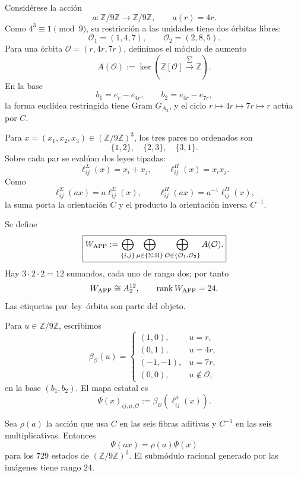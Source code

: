 Considérese la acción
\[
 a:\mathbb Z/9\mathbb Z\longrightarrow\mathbb Z/9\mathbb Z,
 \qquad a(r)=4r.
\]
Como \(4^3\equiv1\pmod9\), su restricción a las unidades tiene dos órbitas
libres:
\[
 \mathcal O_1=(1,4,7),
 \qquad
 \mathcal O_2=(2,8,5).
\]
Para una órbita \(\mathcal O=(r,4r,7r)\), definimos el módulo de aumento
\[
 A(\mathcal O):=
 \ker\!\left(\mathbb Z[\mathcal O]
 \xrightarrow{\,\sum\,}\mathbb Z\right).
\]
En la base
\[
 b_1=e_r-e_{4r},
 \qquad b_2=e_{4r}-e_{7r},
\]
la forma euclídea restringida tiene Gram \(G_{A_2}\), y el ciclo
\(r\mapsto4r\mapsto7r\mapsto r\) actúa por \(C\).

Para \(x=(x_1,x_2,x_3)\in(\mathbb Z/9\mathbb Z)^3\), los tres pares no
ordenados son
\[
 \{1,2\},\quad\{2,3\},\quad\{3,1\}.
\]
Sobre cada par se evalúan dos leyes tipadas:
\[
 \ell_{ij}^{\Sigma}(x)=x_i+x_j,
 \qquad
 \ell_{ij}^{\Pi}(x)=x_ix_j.
\]
Como
\[
 \ell_{ij}^{\Sigma}(ax)=a\ell_{ij}^{\Sigma}(x),
 \qquad
 \ell_{ij}^{\Pi}(ax)=a^{-1}\ell_{ij}^{\Pi}(x),
\]
la suma porta la orientación \(C\) y el producto la orientación inversa
\(C^{-1}\).

\begin{definition}
\label{p12-83-c1-s5:def:modulo-ciclotomico-app-autonomo}
Se define
\[
 \boxed{
 W_{\rm APP}:=
 \bigoplus_{\{i,j\}}
 \bigoplus_{\mu\in\{\Sigma,\Pi\}}
 \bigoplus_{\mathcal O\in\{\mathcal O_1,\mathcal O_2\}}
 A(\mathcal O).}
\]
Hay \(3\cdot2\cdot2=12\) sumandos, cada uno de rango dos; por tanto
\[
 W_{\rm APP}\cong A_2^{12},
 \qquad \operatorname{rank}W_{\rm APP}=24.
\]
Las etiquetas par--ley--órbita son parte del objeto.
\end{definition}

Para \(u\in\mathbb Z/9\mathbb Z\), escribimos
\[
 \beta_{\mathcal O}(u)=
 \begin{cases}
 (1,0),&u=r,\\
 (0,1),&u=4r,\\
 (-1,-1),&u=7r,\\
 (0,0),&u\notin\mathcal O,
 \end{cases}
\]
en la base \((b_1,b_2)\). El mapa estatal es
\[
 \Psi(x)_{ij,\mu,\mathcal O}
 :=\beta_{\mathcal O}(\ell_{ij}^{\mu}(x)).
\]

\begin{theorem}
\label{p12-83-c1-s5:thm:esqueleto-estatal-app-autonomo}
Sea \(\rho(a)\) la acción que usa \(C\) en las seis fibras aditivas y
\(C^{-1}\) en las seis multiplicativas. Entonces
\[
 \boxed{\Psi(ax)=\rho(a)\Psi(x)}
\]
para los \(729\) estados de \((\mathbb Z/9\mathbb Z)^3\). El submódulo
racional generado por las imágenes tiene rango \(24\).
\end{theorem}

